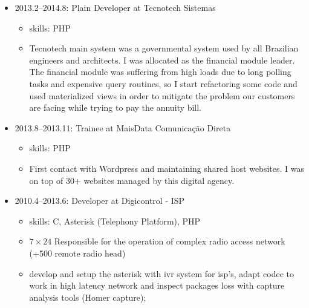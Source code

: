 \documentclass[
]{article}
\providecommand{\tightlist}{%
  \setlength{\itemsep}{0pt}\setlength{\parskip}{0pt}}
\begin{document}
\vspace{2mm}

\begin{itemize}
\tightlist
\item
  2013.2--2014.8: Plain Developer at Tecnotech Sistemas

  \begin{itemize}
  \tightlist
  \item
    skills: PHP
  \item
    Tecnotech main system was a governmental system used by all
    Brazilian engineers and architects. I was allocated as the financial
    module leader. The financial module was suffering from high loads
    due to long polling tasks and expensive query routines, so I start
    refactoring some code and used materialized views in order to
    mitigate the problem our customers are facing while trying to pay
    the annuity bill.
  \end{itemize}
\end{itemize}

\vspace{2mm}

\begin{itemize}
\tightlist
\item
  2013.8--2013.11: Trainee at MaisData Comunicação Direta

  \begin{itemize}
  \tightlist
  \item
    skills: PHP
  \item
    First contact with Wordpress and maintaining shared host websites. I
    was on top of 30+ websites managed by this digital agency.
  \end{itemize}
\end{itemize}

\vspace{2mm}

\begin{itemize}
\tightlist
\item
  2010.4--2013.6: Developer at Digicontrol - ISP

  \begin{itemize}
  \tightlist
  \item
    skills: C, Asterisk (Telephony Platform), PHP
  \item
    \(7 \times 24\) Responsible for the operation of complex radio
    access network (+500 remote radio head)
  \item
    develop and setup the asterisk with ivr system for isp's, adapt
    codec to work in high latency network and inspect packages loss with
    capture analysis tools (Homer capture);
  \end{itemize}
\end{itemize}
\end{document}
